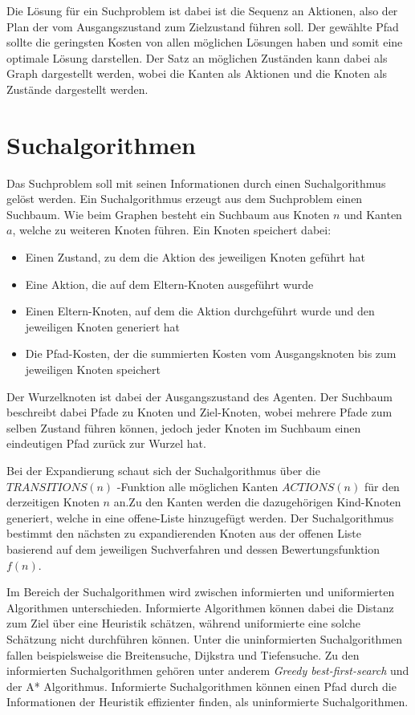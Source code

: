 Die Lösung für ein Suchproblem ist dabei ist die Sequenz an Aktionen, also der Plan der vom Ausgangszustand zum Zielzustand führen soll. Der gewählte Pfad sollte die geringsten Kosten von allen möglichen Lösungen haben und somit eine optimale Lösung darstellen. Der Satz an möglichen Zuständen kann dabei als Graph dargestellt werden, wobei die Kanten als Aktionen und die Knoten als Zustände dargestellt werden.

\section{Suchalgorithmen}

Das Suchproblem soll mit seinen Informationen durch einen Suchalgorithmus gelöst werden. Ein Suchalgorithmus erzeugt aus dem Suchproblem einen Suchbaum. Wie beim Graphen besteht ein Suchbaum aus Knoten $n$ und Kanten $a$, welche zu weiteren Knoten führen. Ein Knoten speichert dabei:
\begin{itemize}
	\item Einen Zustand, zu dem die Aktion des jeweiligen Knoten geführt hat
	\item Eine Aktion, die auf dem Eltern-Knoten ausgeführt wurde
	\item Einen Eltern-Knoten, auf dem die Aktion durchgeführt wurde und den jeweiligen Knoten generiert hat
	\item Die Pfad-Kosten, der die summierten Kosten vom Ausgangsknoten bis zum jeweiligen Knoten speichert
\end{itemize}
Der Wurzelknoten ist dabei der Ausgangszustand des Agenten. Der Suchbaum beschreibt dabei Pfade zu Knoten und Ziel-Knoten, wobei mehrere Pfade zum selben Zustand führen können, jedoch jeder Knoten im Suchbaum einen eindeutigen Pfad zurück zur Wurzel hat.

Bei der Expandierung schaut sich der Suchalgorithmus über die $TRANSITIONS(n)$ -Funktion alle möglichen Kanten $ACTIONS(n)$ für den derzeitigen Knoten $n$ an.Zu den Kanten werden die dazugehörigen Kind-Knoten generiert, welche in eine offene-Liste hinzugefügt werden. Der Suchalgorithmus bestimmt den nächsten zu expandierenden Knoten aus der offenen Liste basierend auf dem jeweiligen Suchverfahren und dessen Bewertungsfunktion $f(n)$.

Im Bereich der Suchalgorithmen wird zwischen informierten und uniformierten Algorithmen unterschieden. Informierte Algorithmen können dabei die Distanz zum Ziel über eine Heuristik schätzen, während uniformierte eine solche Schätzung nicht durchführen können. Unter die uninformierten Suchalgorithmen fallen beispielsweise die Breitensuche, Dijkstra und Tiefensuche. Zu den informierten Suchalgorithmen gehören unter anderem \textit{Greedy best-first-search} und der A* Algorithmus. Informierte Suchalgorithmen können einen Pfad durch die Informationen der Heuristik effizienter finden, als uninformierte Suchalgorithmen.

